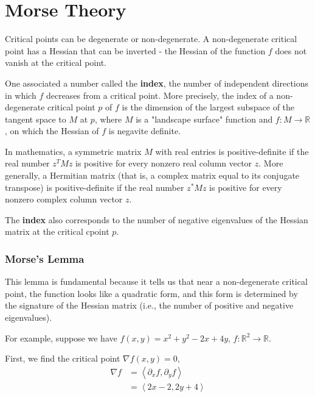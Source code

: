 \section{Morse Theory}

Critical points can be degenerate or non-degenerate.
A non-degenerate critical point has a Hessian that can be inverted - the Hessian of the function $f$ does not vanish
at the critical point.

One associated a number called the \textbf{index}, the number of independent directions in which
$f$ decreases from a critical point.
More precisely, the index of a non-degenerate critical point $p$ of $f$ is the dimension of the largest subspace
of the tangent space to $M$ at $p$, where $M$ is a "landscape surface" function and $f : M \rightarrow \mathbb{R}$,
on which the Hessian of $f$ is negavite definite.

In mathematics, a symmetric matrix $M$ with real entries is positive-definite if the real number $z^T M z$
is positive for every nonzero real column vector $z$.
More generally, a Hermitian matrix (that is, a complex matrix equal to its conjugate transpose) is positive-definite
if the real number $z^* M z$ is positive for every nonzero complex column vector $z$.

The \textbf{index} also corresponds to the number of negative eigenvalues of the Hessian matrix at the critical cpoint $p$.


\subsubsection{Morse's Lemma}

This lemma is fundamental because it tells us that near a non-degenerate critical point, the function looks
like a quadratic form, and this form is determined by the signature of the Hessian matrix
(i.e., the number of positive and negative eigenvalues).

For example, suppose we have $f(x,y) = x^2 + y^2 - 2x + 4y$, $f : \mathbb{R}^2 \rightarrow \mathbb{R}$.

First, we find the critical point $\nabla f(x,y) = 0$,
\begin{align*}
\nabla f &= \left< \partial_x f, \partial_y f \right> \\
&= \left< 2x -2, 2y + 4 \right>
\end{align*}

